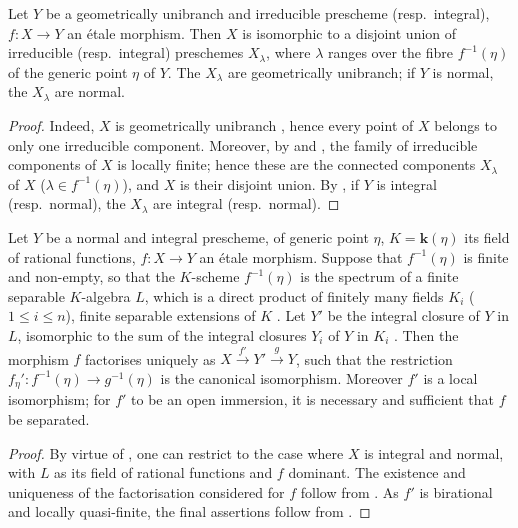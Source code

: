 \begin{proposition}[18.10.7]
\label{IV.18.10.7}
Let $Y$ be a geometrically unibranch and irreducible prescheme \textup{(resp.\ }integral\textup{)}, $f:X\to Y$ an \'etale morphism.
Then $X$ is isomorphic to a disjoint union of irreducible \textup{(resp.\ }integral\textup{)} preschemes $X_\lambda$, where $\lambda$ ranges over the fibre $f^{-1}(\eta)$ of the generic point $\eta$ of $Y$.
The $X_\lambda$ are geometrically unibranch; if $Y$ is normal, the $X_\lambda$ are normal.
\end{proposition}

\begin{proof}
Indeed, $X$ is geometrically unibranch , hence every point of $X$ belongs to only one irreducible component. Moreover, by  and , the family of irreducible components of $X$ is locally finite; hence  these are the connected components $X_\lambda$ of $X$ ($\lambda\in f^{-1}(\eta)$), and $X$ is their disjoint union. By , if $Y$ is integral (resp.\ normal), the $X_\lambda$ are integral (resp.\ normal).
\end{proof}

\begin{proposition}[18.10.8]
\label{IV.18.10.8}
Let $Y$ be a normal and integral prescheme, of generic point $\eta$, $K=\boldsymbol{k}(\eta)$ its field of rational functions, $f:X\to Y$ an \'etale morphism.
Suppose that $f^{-1}(\eta)$ is finite and non-empty, so that the $K$-scheme $f^{-1}(\eta)$ is the spectrum of a finite separable $K$-algebra $L$, which is a direct product of finitely many fields $K_i$ \textup{($1\leq i\leq n$)}, finite separable extensions of $K$ .
Let $Y'$ be the integral closure of $Y$ in $L$, isomorphic to the sum of the integral closures $Y_i$ of $Y$ in $K_i$ .
Then the morphism $f$ factorises uniquely as $X\xrightarrow{f'}Y'\xrightarrow{g}Y$, such that the restriction $f_\eta':f^{-1}(\eta)\to g^{-1}(\eta)$ is the canonical isomorphism.
Moreover $f'$ is a local isomorphism; for $f'$ to be an open immersion, it is necessary and sufficient that $f$ be separated.
\end{proposition}

\begin{proof}
By virtue of , one can restrict to the case where $X$ is integral and normal, with $L$ as its field of rational functions and $f$ dominant.
The existence and uniqueness of the factorisation considered for $f$ follow from .
As $f'$ is birational and locally quasi-finite, the final assertions follow from .
\end{proof}

